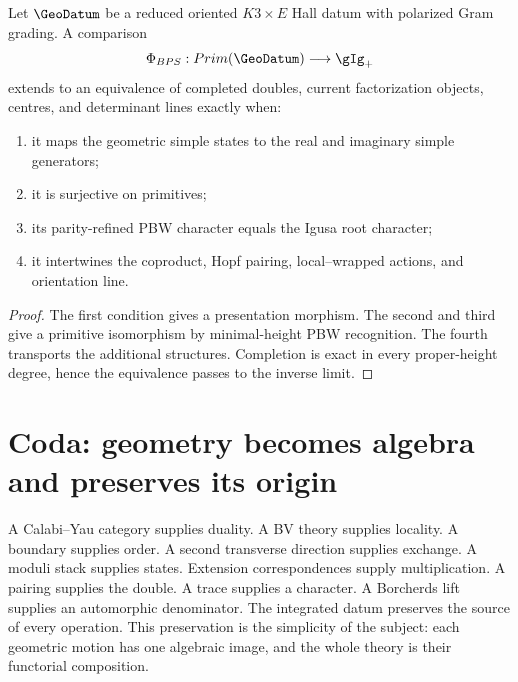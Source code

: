 \begin{theorem}
Let $\GeoDatum$ be a reduced oriented $K3\times E$ Hall datum with polarized Gram grading.  A comparison
\[
 \Phi_{\mathrm{BPS}}:\Prim(\GeoDatum)\longrightarrow\gIg_+
\]
extends to an equivalence of completed doubles, current factorization objects, centres, and determinant lines exactly when:
\begin{enumerate}
\item it maps the geometric simple states to the real and imaginary simple generators;
\item it is surjective on primitives;
\item its parity-refined PBW character equals the Igusa root character;
\item it intertwines the coproduct, Hopf pairing, local--wrapped actions, and orientation line.
\end{enumerate}
\end{theorem}
\begin{proof}
The first condition gives a presentation morphism.  The second and third give a primitive isomorphism by minimal-height PBW recognition.  The fourth transports the additional structures.  Completion is exact in every proper-height degree, hence the equivalence passes to the inverse limit.
\end{proof}

\chapter{Coda: geometry becomes algebra and preserves its origin}
A Calabi--Yau category supplies duality.  A BV theory supplies locality.  A boundary supplies order.  A second transverse direction supplies exchange.  A moduli stack supplies states.  Extension correspondences supply multiplication.  A pairing supplies the double.  A trace supplies a character.  A Borcherds lift supplies an automorphic denominator.  The integrated datum preserves the source of every operation.  This preservation is the simplicity of the subject: each geometric motion has one algebraic image, and the whole theory is their functorial composition.
